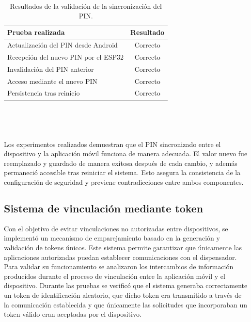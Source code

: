 \begin{table}[H]
\centering
\caption{Resultados de la validación de la sincronización del PIN.}
\label{tab:sincronizacion_pin}
\begin{tabular}{|l|c|}
\hline
\textbf{Prueba realizada} & \textbf{Resultado} \\ \hline
Actualización del PIN desde Android & Correcto \\ \hline
Recepción del nuevo PIN por el ESP32 & Correcto \\ \hline
Invalidación del PIN anterior & Correcto \\ \hline
Acceso mediante el nuevo PIN & Correcto \\ \hline
Persistencia tras reinicio & Correcto \\ \hline
\end{tabular}
\end{table}

\

\

Los experimentos realizados demuestran que el PIN sincronizado entre el dispositivo y la aplicación móvil funciona de manera adecuada. El valor nuevo fue reemplazado y guardado de manera exitosa después de cada cambio, y además permaneció accesible tras reiniciar el sistema. Esto asegura la consistencia de la configuración de seguridad y previene contradicciones entre ambos componentes.

\subsection{Sistema de vinculación mediante token}

Con el objetivo de evitar vinculaciones no autorizadas entre dispositivos, se implementó un mecanismo de emparejamiento basado en la generación y validación de tokens únicos. Este sistema permite garantizar que únicamente las aplicaciones autorizadas puedan establecer comunicaciones con el dispensador.\\

Para validar su funcionamiento se analizaron los intercambios de información producidos durante el proceso de vinculación entre la aplicación móvil y el dispositivo. Durante las pruebas se verificó que el sistema generaba correctamente un token de identificación aleatorio, que dicho token era transmitido a través de la comunicación establecida y que únicamente las solicitudes que incorporaban un token válido eran aceptadas por el dispositivo.\\


